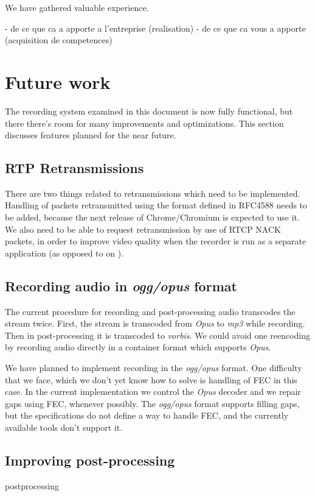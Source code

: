 \documentclass[twoside,openright,a4paper,12pt,english]{article}
\begin{document}
We have gathered valuable experience.

- de ce que ca a apporte a l’entreprise (realisation)
- de ce que ca vous a apporte (acquisition de competences)

\section{Future work}
\label{future-work}
The recording system examined in this document is now fully functional,
but there there's room for many improvements and optimizations. This section
discusses features planned for the near future.

\subsection{RTP Retransmissions}
There are two things related to retransmissions which need to be implemented.
Handling of packets retransmitted using the format defined in RFC4588 needs to
be added, because the next release of Chrome/Chromium is expected to use it.
We also need to be able to request retransmission by use of RTCP NACK packets,
in order to improve video quality when the recorder is run as a separate
application (as opposed to on \jvb).

\subsection{Recording audio in \emph{ogg/opus} format}
\label{ogg-opus}
The current procedure for recording and post-processing audio transcodes the stream
twice. First, the stream is transcoded from \emph{Opus} to \emph{mp3} while recording.
Then in post-processing it is transcoded to \emph{vorbis}. We could avoid one reencoding
by recording audio directly in a container format which supports \emph{Opus}.

We have planned to implement recording in the \emph{ogg/opus} format. One difficulty
that we face, which we don't yet know how to solve is handling of FEC in this
case. In the current implementation we control the \emph{Opus} decoder and we
repair gaps using FEC, whenever possibly. The \emph{ogg/opus} format supports
filling gaps, but the specifications\cite{ogg,ogg-opus} do not define a way to
handle FEC, and the currently available tools don't support it.

\subsection{Improving post-processing}
postprocessing
\end{document}

